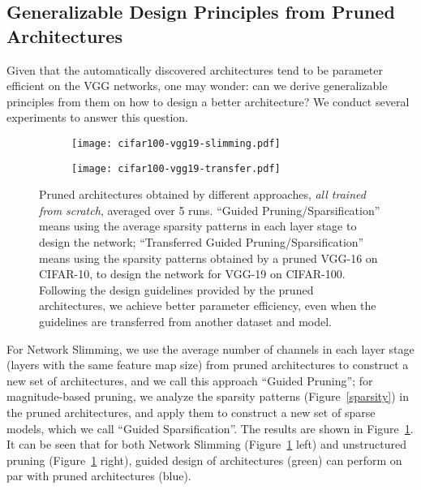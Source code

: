 \subsection{Generalizable Design Principles from Pruned Architectures} 
Given that the automatically discovered architectures tend to be parameter efficient on the VGG networks, one may wonder: can we derive generalizable principles from them on how to design a better architecture? We conduct several experiments to answer this question.


\begin{figure}[!htbp]
\centering
\begin{minipage}{.47\textwidth}
 \begin{subfigure}{\textwidth}
 \centering
 \texttt{[image: cifar100-vgg19-slimming.pdf]}
 \end{subfigure}
\end{minipage}
\begin{minipage}{.47\textwidth}
 \begin{subfigure}{\textwidth}
 \centering
\texttt{[image: cifar100-vgg19-transfer.pdf]}
 \end{subfigure}
\end{minipage}
    \caption{
      Pruned architectures obtained by different approaches, \emph{all trained from scratch}, averaged over 5 runs.
      ``Guided Pruning/Sparsification'' means using the average sparsity patterns in each layer stage  to design the network; ``Transferred Guided Pruning/Sparsification'' means using the sparsity patterns obtained by a pruned VGG-16 on CIFAR-10, to design the network for VGG-19 on CIFAR-100. 
    Following the design guidelines provided by the pruned architectures, we achieve better parameter efficiency, even when the guidelines are transferred from another dataset and model.}
    \label{arch-search-2}
\end{figure}


For Network Slimming, we use the average number of channels in each layer stage (layers with the same feature map size) from pruned architectures to construct a new set of architectures, and we call this approach ``Guided Pruning'';
for magnitude-based pruning, we analyze the sparsity patterns (Figure~\ref{sparsity}) in the pruned architectures,
and apply them to construct a new set of sparse models, which we call ``Guided Sparsification''. The results are shown in Figure~\ref{arch-search-2}. It can be seen that for both Network Slimming (Figure~\ref{arch-search-2} left) and unstructured pruning (Figure~\ref{arch-search-2} right), guided design of architectures (green) can perform on par with pruned architectures (blue).

